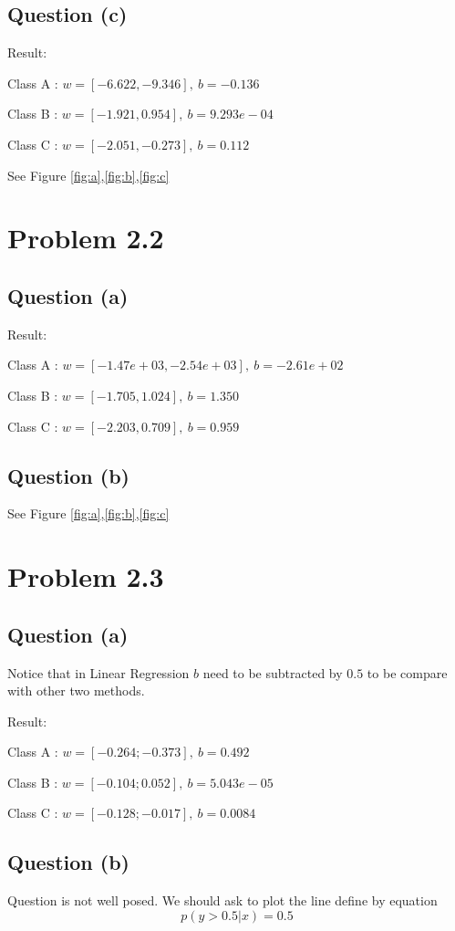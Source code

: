 \documentclass{article}
\begin{document}
	\subsection{Question (c)}
	Result:
	
	Class A : $w = [-6.622,-9.346],\ b=-0.136$
	
	Class B : $w = [-1.921,0.954],\ b=9.293e-04$
	
	Class C : $w = [-2.051,-0.273],\ b=0.112$
	
	See Figure \ref{fig:a},\ref{fig:b},\ref{fig:c}
	
	
	\section{Problem 2.2}
	\subsection{Question (a)}
	Result:
	
	Class A : $w = [-1.47e+03,-2.54e+03],\ b=-2.61e+02$
	
	Class B : $w = [-1.705,1.024],\ b=1.350$
	
	Class C : $w = [-2.203,0.709],\ b=0.959$
	\subsection{Question (b)}
	
	See Figure \ref{fig:a},\ref{fig:b},\ref{fig:c}
	

	\section{Problem 2.3}
	\subsection{Question (a)}
	Notice that in Linear Regression $b$ need to be subtracted by $0.5$ to be compare with other two methods.
	
	Result:
	
	Class A : $w = [-0.264;-0.373],\ b=0.492$
	
	Class B : $w = [-0.104;0.052],\ b=5.043e-05$
	
	Class C : $w = [-0.128;-0.017],\ b=0.0084$
	\subsection{Question (b)}
	Question is not well posed. We should ask to plot the line define by equation
	$$
	p(y>0.5|x) = 0.5
	$$
	
\end{document}
